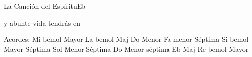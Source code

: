 \documentclass[12pt, spanish]{book}
\begin{document}
\begin{song}{La Canción del Espíritu}{Eb}
\begin{SBOpGroup}
            y abunte vida  tendrás en ~
        \end{SBOpGroup}

        \ifChordBk
        \begin{SBOpGroup}
            Acordes:
            \upchord{\Eflat}\qquad Mi bemol Mayor \hfill
            \upchord{\AflatMaj}\qquad La bemol Maj \hfill\null\break
            \upchord{\Cm}\qquad Do Menor \hfill
            \upchord{\Fmseven}\quad Fa menor S\'eptima \hfill\null\break
            \upchord{\Bflatseven}\qquad Si bemol Mayor S\'eptima \hfill
            \upchord{\Gmseven}\qquad Sol Menor S\'eptima \hfill\null\break
            \upchord{\Cmseven}\qquad Do Menor s\'eptima \hfill
            \upchord{\EflatMaj}Eb Maj \hfill\null\break
            \upchord{\Dflat}\qquad Re bemol Mayor  \hfill\null\break
        \end{SBOpGroup}
        \fi
    \end{song}
\end{document}
